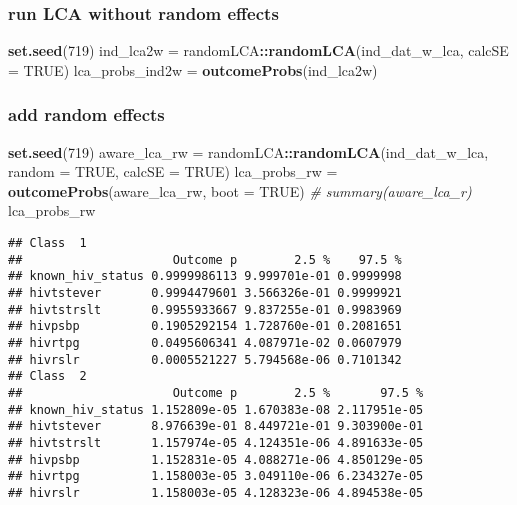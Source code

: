 \documentclass[
]{article}
\newenvironment{Shaded}{\begin{snugshade}}{\end{snugshade}}
\newcommand{\CommentTok}[1]{\textcolor[rgb]{0.56,0.35,0.01}{\textit{#1}}}
\newcommand{\DataTypeTok}[1]{\textcolor[rgb]{0.13,0.29,0.53}{#1}}
\newcommand{\DecValTok}[1]{\textcolor[rgb]{0.00,0.00,0.81}{#1}}
\newcommand{\KeywordTok}[1]{\textcolor[rgb]{0.13,0.29,0.53}{\textbf{#1}}}
\newcommand{\NormalTok}[1]{#1}
\newcommand{\OperatorTok}[1]{\textcolor[rgb]{0.81,0.36,0.00}{\textbf{#1}}}
\newcommand{\OtherTok}[1]{\textcolor[rgb]{0.56,0.35,0.01}{#1}}
\newcommand{\StringTok}[1]{\textcolor[rgb]{0.31,0.60,0.02}{#1}}
\begin{document}
\hypertarget{run-lca-without-random-effects}{%
\subsubsection{run LCA without random
effects}\label{run-lca-without-random-effects}}

\begin{Shaded}
\begin{Highlighting}[]
\KeywordTok{set.seed}\NormalTok{(}\DecValTok{719}\NormalTok{)}
\NormalTok{ind_lca2w =}\StringTok{ }\NormalTok{randomLCA}\OperatorTok{::}\KeywordTok{randomLCA}\NormalTok{(ind_dat_w_lca, }\DataTypeTok{calcSE =} \OtherTok{TRUE}\NormalTok{)}
\NormalTok{lca_probs_ind2w =}\StringTok{ }\KeywordTok{outcomeProbs}\NormalTok{(ind_lca2w)}
\end{Highlighting}
\end{Shaded}

\hypertarget{add-random-effects}{%
\subsubsection{add random effects}\label{add-random-effects}}

\begin{Shaded}
\begin{Highlighting}[]
\KeywordTok{set.seed}\NormalTok{(}\DecValTok{719}\NormalTok{)}
\NormalTok{aware_lca_rw =}\StringTok{ }\NormalTok{randomLCA}\OperatorTok{::}\KeywordTok{randomLCA}\NormalTok{(ind_dat_w_lca, }\DataTypeTok{random =} \OtherTok{TRUE}\NormalTok{, }\DataTypeTok{calcSE =} \OtherTok{TRUE}\NormalTok{)}
\NormalTok{lca_probs_rw =}\StringTok{ }\KeywordTok{outcomeProbs}\NormalTok{(aware_lca_rw, }\DataTypeTok{boot =} \OtherTok{TRUE}\NormalTok{)}
\CommentTok{# summary(aware_lca_r)}
\NormalTok{lca_probs_rw}
\end{Highlighting}
\end{Shaded}

\begin{verbatim}
## Class  1 
##                     Outcome p        2.5 %    97.5 %
## known_hiv_status 0.9999986113 9.999701e-01 0.9999998
## hivtstever       0.9994479601 3.566326e-01 0.9999921
## hivtstrslt       0.9955933667 9.837255e-01 0.9983969
## hivpsbp          0.1905292154 1.728760e-01 0.2081651
## hivrtpg          0.0495606341 4.087971e-02 0.0607979
## hivrslr          0.0005521227 5.794568e-06 0.7101342
## Class  2 
##                     Outcome p        2.5 %       97.5 %
## known_hiv_status 1.152809e-05 1.670383e-08 2.117951e-05
## hivtstever       8.976639e-01 8.449721e-01 9.303900e-01
## hivtstrslt       1.157974e-05 4.124351e-06 4.891633e-05
## hivpsbp          1.152831e-05 4.088271e-06 4.850129e-05
## hivrtpg          1.158003e-05 3.049110e-06 6.234327e-05
## hivrslr          1.158003e-05 4.128323e-06 4.894538e-05
\end{verbatim}
\end{document}
